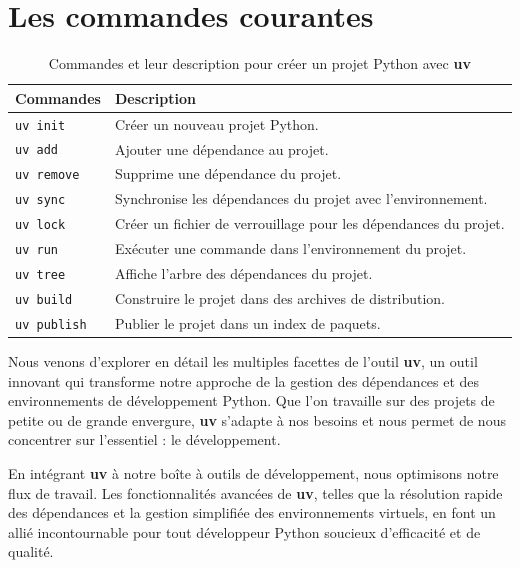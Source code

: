 \section{Les commandes courantes}
\begin{table}[h!]
\centering
\begin{tabular}{|l|p{12cm}|}
\hline
\textbf{Commandes} & \textbf{Description} \\
\hline
\texttt{uv init} & Créer un nouveau projet Python. \\
\hline
\texttt{uv add} & Ajouter une dépendance au projet. \\
\hline
\texttt{uv remove} & Supprime une dépendance du projet. \\
\hline
\texttt{uv sync} & Synchronise les dépendances du projet avec l'environnement. \\
\hline
\texttt{uv lock} & Créer un fichier de verrouillage pour les dépendances du projet. \\
\hline
\texttt{uv run} & Exécuter une commande dans l'environnement du projet. \\
\hline
\texttt{uv tree} & Affiche l'arbre des dépendances du projet. \\
\hline
\texttt{uv build} & Construire le projet dans des archives de distribution. \\
\hline
\texttt{uv publish} & Publier le projet dans un index de paquets. \\
\hline
\end{tabular}
    \caption{Commandes et leur description pour créer un projet Python avec \textbf{uv}}
\end{table}
\bigskip

\begin{center}
\end{center}

Nous venons d'explorer en détail les multiples facettes de l'outil \textbf{uv}, un outil innovant qui transforme notre approche de la gestion des dépendances et des environnements de développement Python. Que l'on travaille sur des projets de petite ou de grande envergure, \textbf{uv} s'adapte à nos besoins et nous permet de nous concentrer sur l'essentiel : le développement. 

En intégrant \textbf{uv} à notre boîte à outils de développement, nous optimisons notre flux de travail. Les fonctionnalités avancées de \textbf{uv}, telles que la résolution rapide des dépendances et la gestion simplifiée des environnements virtuels, en font un allié incontournable pour tout développeur Python soucieux d'efficacité et de qualité.

